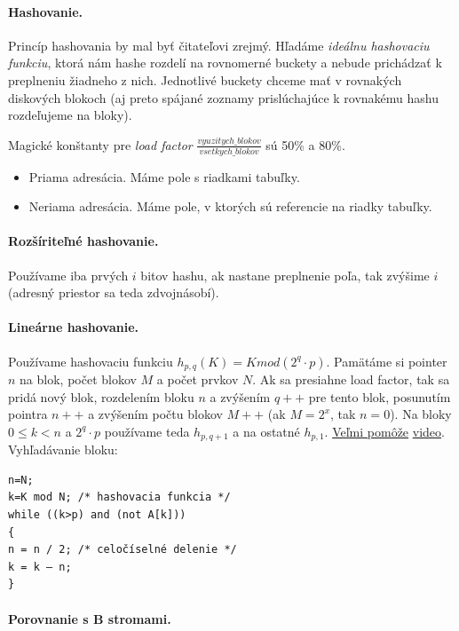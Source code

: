 \documentclass[10pt,a4paper]{article}
\begin{document}
\paragraph{Hashovanie.}
Princíp hashovania by mal byť čitateľovi zrejmý. Hľadáme \emph{ideálnu hashovaciu funkciu},
ktorá nám hashe rozdelí na rovnomerné buckety a nebude prichádzať k preplneniu žiadneho z nich.
Jednotlivé buckety chceme mať v rovnakých diskových blokoch (aj preto spájané zoznamy prislúchajúce k rovnakému hashu rozdeľujeme na bloky).

Magické konštanty pre \emph{load factor} $\frac{vyuzitych\_blokov}{vsetkych\_blokov}$ sú 50\% a 80\%.

\begin{itemize}
\item Priama adresácia. Máme pole s riadkami tabuľky.
\item Neriama adresácia. Máme pole, v ktorých sú referencie na riadky tabuľky.
\end{itemize}

\paragraph{Rozšíriteľné hashovanie.}
Používame iba prvých $i$ bitov hashu, ak nastane preplnenie poľa, tak zvýšime $i$ (adresný priestor sa teda zdvojnásobí).

\paragraph{Lineárne hashovanie.}
Používame hashovaciu funkciu $h_{p,q}(K)=K mod (2^q \cdot p)$. Pamätáme si pointer $n$ na blok, počet blokov $M$ a počet prvkov $N$.
Ak sa presiahne load factor, tak sa pridá nový blok, rozdelením bloku $n$ a zvýšením $q++$ pre tento blok, posunutím pointra $n++$ a zvýšením počtu blokov $M++$ (ak $M=2^x$, tak $n=0$).
Na bloky $0 \leq k < n$ a $2^q \cdot p$ používame teda $h_{p,q+1}$ a na ostatné $h_{p,1}$.
\underline{Veľmi pomôže} \href{http://www.youtube.com/watch?v=Yw1ts57uL7c}{video}. Vyhľadávanie bloku:
\begin{verbatim}
n=N;
k=K mod N; /* hashovacia funkcia */
while ((k>p) and (not A[k]))
{
n = n / 2; /* celočíselné delenie */
k = k – n;
}
\end{verbatim}

\paragraph{Porovnanie s B stromami.}
\end{document}
